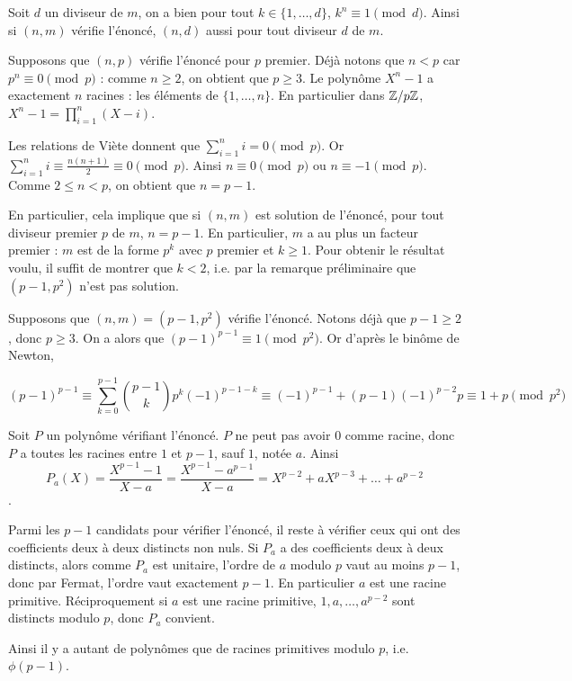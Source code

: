 \begin{sol}
Soit $d$ un diviseur de $m$, on a bien pour tout $k\in \{1,\dots, d\}$, $k^n\equiv 1 \pmod{d}$. Ainsi si $(n,m)$ vérifie l'énoncé, $(n,d)$ aussi pour tout diviseur $d$ de $m$.

Supposons que $(n,p)$ vérifie l'énoncé pour $p$ premier. Déjà notons que $n<p$ car $p^n\equiv 0 \pmod{p}$ : comme $n\geq 2$, on obtient que $p\geq 3$. Le polynôme $X^n - 1$ a exactement $n$ racines : les éléments de $\{1,\dots, n\}$. En particulier dans $\mathbb Z/p\mathbb Z$, $X^n - 1=\prod\limits_{i=1}^n(X - i)$.

Les relations de Viète donnent que $\sum\limits_{i=1}^n i=0\pmod{p}$. Or $\sum\limits_{i=1}^n i\equiv \frac{n(n + 1)}{2}\equiv 0\pmod{p}$. Ainsi $n\equiv 0\pmod{p}$ ou $n\equiv  - 1\pmod{p}$. Comme $2\leq n <p$, on obtient que $n=p - 1$.\medskip

En particulier, cela implique que si $(n,m)$ est solution de l'énoncé, pour tout diviseur premier $p$ de $m$, $n=p - 1$. En particulier, $m$ a au plus un facteur premier : $m$ est de la forme $p^k$ avec $p$ premier et $k\geq 1$. Pour obtenir le résultat voulu, il suffit de montrer que $k<2$, i.e. par la remarque préliminaire que $(p - 1,p^2)$ n'est pas solution.

Supposons que $(n,m)=(p - 1,p^2)$ vérifie l'énoncé. Notons déjà que $p - 1\geq 2$, donc $p\geq 3$. On a alors que $(p - 1)^{p - 1}\equiv 1 \pmod{p^2}$. Or d'après le binôme de Newton,

$$(p - 1)^{p - 1}\equiv \sum\limits_{k=0}^{p - 1}\binom{p - 1}{k}p^{k}( - 1)^{p - 1 - k}\equiv (-1)^{p - 1} + (p - 1)(-1)^{p - 2}p\equiv 1 + p\pmod{p^2}$$


\end{sol}

\begin{sol}
Soit $P$ un polynôme vérifiant l'énoncé. $P$ ne peut pas avoir $0$ comme racine, donc $P$ a toutes les racines entre $1$ et $p - 1$, sauf $1$, notée $a$. Ainsi $$P_a(X)=\frac{X^{p - 1} - 1}{X - a}=\frac{X^{p - 1} - a^{p - 1}}{X - a}=X^{p - 2} + aX^{p - 3} + \dots + a^{p - 2}$$.

Parmi les $p - 1$ candidats pour vérifier l'énoncé, il reste à vérifier ceux qui ont des coefficients deux à deux distincts non nuls. Si $P_a$ a des coefficients deux à deux distincts, alors comme $P_a$ est unitaire, l'ordre de $a$ modulo $p$ vaut au moins $p - 1$, donc par Fermat, l'ordre vaut exactement $p - 1$. En particulier $a$ est une racine primitive. Réciproquement si $a$ est une racine primitive, $1,a,\dots, a^{p - 2}$ sont distincts modulo $p$, donc $P_a$ convient.

Ainsi il y a autant de polynômes que de racines primitives modulo $p$, i.e. $\phi(p - 1)$.
\end{sol}

